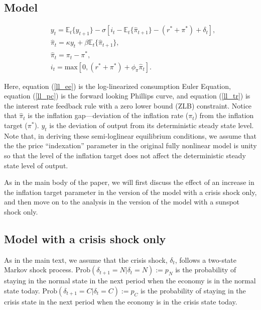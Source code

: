 \documentclass[11pt]{article}
\begin{document}
\begin{singlespace}
		\subsection{Model}

		\begin{align}
			& y_{t} = \mathbb{E}_t\{y_{t+1}\}  -\sigma \left[i_t - \mathbb{E}_t\{\hat{\pi}_{t+1}\} - (r^* + \pi^*) + \delta_t \right],\label{ll_ee}\\
			& \hat{\pi}_{t} = \kappa y_t + \beta\mathbb{E}_t\{\hat{\pi}_{t+1}\}\label{ll_pc},\\
			& \hat{\pi}_{t} = \pi_t - \pi^*,\\
			& i_t = \text{max}\left[0, (r^* + \pi^*) +  \phi_{\pi}\hat{\pi}_{t}\right].\label{ll_tr}
		\end{align}

		\noindent Here, equation (\ref{ll_ee}) is the log-linearized consumption Euler Equation, equation (\ref{ll_pc}) is the forward looking Phillips curve, and  equation (\ref{ll_tr}) is the interest rate feedback rule with a zero lower bound (ZLB) constraint. Notice that $\hat{\pi}_{t}$ is the inflation gap---deviation of the inflation rate ($\pi_{t}$) from the inflation target ($\pi^*$). $y_{t}$ is the deviation of output from its deterministic steady state level. Note that, in deriving these semi-loglinear equilibrium conditions, we assume that the the price ``indexation'' parameter in the original fully nonlinear model is unity so that the level of the inflation target does not affect the deterministic steady state level of output.

		As in the main body of the paper, we will first discuss the effect of an increase in the inflation target parameter in the version of the model with a crisis shock only, and then move on to the analysis in the version of the model with a sunspot shock only.

		\subsection{Model with a crisis shock only}

		As in the main text, we assume that the crisis shock, $\delta_{t}$, follows a two-state Markov shock process. $ \text{Prob}(\delta_{t+1}=N|\delta_{t}=N):= p_{N}$ is the probability of staying in the normal state in the next period when the economy is in the normal state today. $\text{Prob}(\delta_{t+1}=C|\delta_{t}=C) := p_C$ is the probability of staying in the crisis state in the next period when the economy is in the crisis state today.


\end{singlespace}
\end{document}
